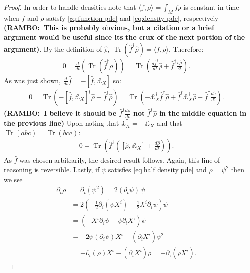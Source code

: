\documentclass[final,leqno]{siamltex1213}
\newcommand{\ram}[1]{{\normalsize{\textbf{({\color{red}RAMBO:\ }#1)}}}}
\DeclareMathOperator{\Tr}{Tr}
\begin{document}
\begin{proof}
	In order to handle densities note that $\langle f , \rho \rangle = \int_{M} f\rho$ is constant in time when $f$ and $\rho$ satisfy \eqref{eq:function pde} and \eqref{eq:density pde}, respectively \ram{This is probably obvious, but a citation or a brief argument would be useful since its the crux of the next portion of the argument}.
	By the definition of $\hat{\rho}$, $\Tr( \hat{f}^{\dagger} \hat{\rho}) = \langle f , \rho \rangle$.
	Therefore:
	\begin{align}
		0 = \frac{d}{dt} \left( \Tr( \hat{f}^{\dagger} \rho ) \right) = \Tr \left( \frac{d \hat{f}^{\dagger}}{dt} \hat{\rho} + \hat{f}^{\dagger} \frac{d \hat{\rho}}{dt} \right).
	\end{align}
	As was just shown, $\frac{d}{dt} \hat{f} =  - [\hat{f} , \pounds_{X} ]$ so:
	\begin{align}
		0 = \Tr( - [\hat{f} , \pounds_{X} ]^{\dagger} \hat{\rho} + \hat{f}^{\dagger} \hat{\rho} ) = \Tr( - \pounds_{X}^{\dagger} \hat{f}^{\dagger} \hat{\rho} + \hat{f}^{\dagger} \pounds_{X}^{\dagger} \hat{\rho} + \hat{f}^{\dagger} \frac{d\hat{\rho}}{dt} ).
	\end{align}
	\ram{I believe it should be $\hat{f}^{\dagger} \frac{d\hat{\rho}}{dt}$ not $\hat{f}^{\dagger} \hat{\rho}$ in the middle equation in the previous line}
	Upon noting that $\pounds_{X}^{\dagger} = - \pounds_{X}$ and that $\Tr( a b c) = \Tr( bc a)$:
	\begin{align}
		0 = \Tr \left( \hat{f}^{\dagger}( [\hat{\rho} , \pounds_{X} ] + \frac{d \hat{\rho}}{dt} ) \right).
	\end{align}
	As $\hat{f}$ was chosen arbitrarily, the desired result follows.
	Again, this line of reasoning is reversible.
%	
%	
	Lastly, if $\psi$ satisfies \eqref{eq:half density pde} and $\rho = \psi^{2}$ then we see
	\begin{align}
		\partial_{t} \rho &= \partial_{t} ( \psi^{2}) = 2 (\partial_{t} \psi ) \, \psi \\
		&= 2 \left( - \frac{1}{2} \partial_{i} (\psi X^{i}) - \frac{1}{2} X^{i} \partial_{i} \psi \right) \psi \\
		&= \left( - X^{i} \partial_{i} \psi - \psi \partial_{i} X^{i}  \right) \psi \\
		&= - 2 \psi (\partial_{i} \psi) X^{i} - (\partial_{i}X^{i}) \psi^{2}\\
		&= - \partial_{i}(\rho) X^{i} - (\partial_{i}X^{i}) \rho = - \partial_{i} ( \rho X^{i}).
	\end{align}
\end{proof}
\end{document}
